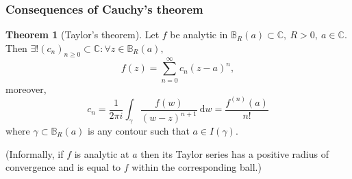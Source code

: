 \documentclass[a4paper]{article}
\theoremstyle{definition}
\newtheorem{thm}[defn]{Theorem}
\begin{document}
\subsubsection{Consequences of Cauchy's theorem}
\begin{thm}[Taylor's theorem]
Let $f$ be analytic in $\mathbb B_R(a) \subset \mathbb C,\ R>0,\ a\in \mathbb C$. Then $\exists ! (c_n)_{n\geq 0} \subset \mathbb C:\forall z\in \mathbb B_R(a),$
\[
f(z) = \sum_{n=0}^\infty c_n (z-a)^n,
\]
moreover, 
\[
c_n = \frac{1}{2\pi i} \int_\gamma \frac{f(w)}{(w-z)^{n+1}} \ \mathrm d w = \frac{f^{(n)}(a)}{n!}
\]
where $\gamma \subset \mathbb B_R(a)$ is any contour such that $a\in I(\gamma)$.

(Informally, if $f$ is analytic at $a$ then its Taylor series has a positive radius of convergence and is equal to $f$ within the corresponding ball.)
\end{thm}
\end{document}
